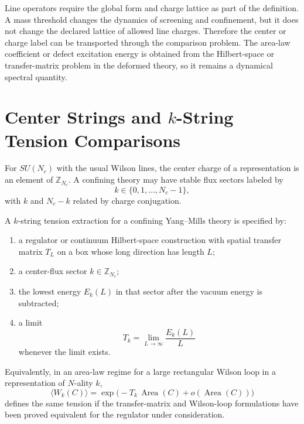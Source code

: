 \begin{controlledapproximation}
Line operators require the global form and charge lattice as part of the
definition.  A mass threshold changes the dynamics of screening and
confinement, but it does not change the declared lattice of allowed line
charges.  Therefore the center or charge label can be transported through the
comparison problem.  The area-law coefficient or defect excitation energy is
obtained from the Hilbert-space or transfer-matrix problem in the deformed
theory, so it remains a dynamical spectral quantity.
\end{controlledapproximation}

\section[Center Strings and k-String Tension Comparisons]{Center Strings and \(k\)-String Tension Comparisons}
\label{sec:susy-ym-family-k-string-tensions}

For \(SU(N_c)\) with the usual Wilson lines, the center charge of a
representation is an element of \(\mathbb Z_{N_c}\).  A confining theory may
have stable flux sectors labeled by
\[
  k\in\{0,1,\ldots,N_c-1\},
\]
with \(k\) and \(N_c-k\) related by charge conjugation.

\begin{definition}
\label{def:k-string-tension-extraction}
A \(k\)-string tension extraction for a confining Yang--Mills theory is
specified by:
\begin{enumerate}[label=(\roman*)]
\item a regulator or continuum Hilbert-space construction with spatial
  transfer matrix \(T_L\) on a box whose long direction has length \(L\);
\item a center-flux sector \(k\in\mathbb Z_{N_c}\);
\item the lowest energy \(E_k(L)\) in that sector after the vacuum energy is
  subtracted;
\item a limit
  \begin{equation}
    T_k=\lim_{L\to\infty}\frac{E_k(L)}{L}
    \label{eq:k-string-transfer-tension}
  \end{equation}
  whenever the limit exists.
\end{enumerate}
Equivalently, in an area-law regime for a large rectangular Wilson loop in a
representation of \(N\)-ality \(k\),
\begin{equation}
  \langle W_k(C)\rangle
  =
  \exp\!\bigl(-T_k\,\operatorname{Area}(C)+o(\operatorname{Area}(C))\bigr)
  \label{eq:k-string-area-law}
\end{equation}
defines the same tension if the transfer-matrix and Wilson-loop formulations
have been proved equivalent for the regulator under consideration.
\end{definition}

